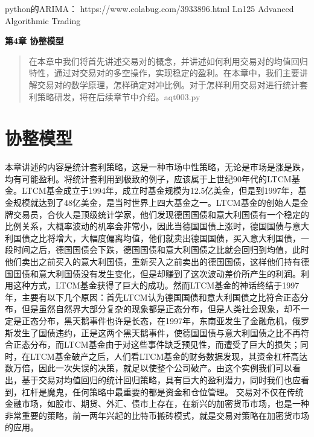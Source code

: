 \documentclass{article}
\begin{document}
python的ARIMA：   https://www.colabug.com/3933896.html
Ln125 Advanced Algorithmic Trading
























\maketitle\begin{center}
\Large \textbf{第4章 协整模型}
\end{center}
\begin{abstract}
在本章中我们将首先讲述交易对的概念，并讲述如何利用交易对的均值回归特性，通过对交易对的多空操作，实现稳定的盈利。在本章中，我们主要讲解交易对的数学原理，怎样确定对冲比例。对于怎样利用交易对进行统计套利策略研发，将在后续章节中介绍。aqt003.py
\end{abstract}
\section{协整模型}
本章讲述的内容是统计套利策略，这是一种市场中性策略，无论是市场是涨是跌，均有可能盈利。将统计套利用到极致的例子，应该属于上世纪90年代的LTCM基金。LTCM基金成立于1994年，成立时基金规模为12.5亿美金，但是到1997年，基金规模就达到了48亿美金，是当时世界上四大基金之一。LTCM基金的创始人是金牌交易员，合伙人是顶级统计学家，他们发现德国国债和意大利国债有一个稳定的比例关系，大概率波动的机率会非常小，因此当德国国债上涨时，德国国债与意大利国债之比将增大，大幅度偏离均值，他们就卖出德国国债，买入意大利国债，一段时间之后，德国国债会下跌，德国国债和意大利国债之比就会回归到均值，此时他们卖出之前买入的意大利国债，重新买入之前卖出的德国国债，这样他们持有德国国债和意大利国债没有发生变化，但是却赚到了这次波动差价所产生的利润。利用这种方式，LTCM基金获得了巨大的成功。然而LTCM基金的神话终结于1997年，主要有以下几个原因：首先LTCM认为德国国债和意大利国债之比符合正态分布，但是虽然自然界大部分复杂的现象都是正态分布，但是人类社会现象，却不一定是正态分布，黑天鹅事件也许是长态，在1997年，东南亚发生了金融危机，俄罗斯发生了国债违约，正是这两个黑天鹅事件，使德国国债与意大利国债之比不再符合正态分布，而LTCM基金由于对这些事件缺乏预见性，而遭受了巨大的损失；同时，在LTCM基金破产之后，人们看LTCM基金的财务数据发现，其资金杠杆高达数万倍，因此一次失误的决策，就足以使整个公司破产。由这个实例我们可以看出，基于交易对均值回归的统计回归策略，具有巨大的盈利潜力，同时我们也应看到，杠杆是魔鬼，任何策略中最重要的都是资金和仓位管理。\newline
交易对不仅在传统金融市场，如股市、期货、外汇、债市上存在，在新兴的加密货币市场，也是一种非常重要的策略，前一两年兴起的比特币搬砖模式，就是交易对策略在加密货市场的应用。
\end{document}
